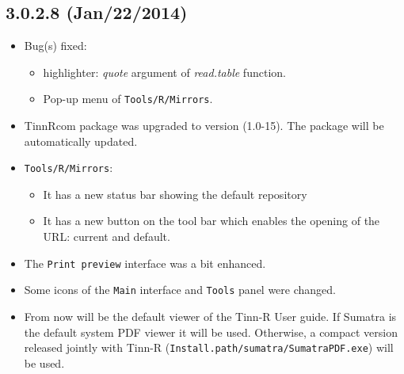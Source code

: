 \subsection*{3.0.2.8 (Jan/22/2014)}
\begin{itemize}
  \item Bug(s) fixed:
    \begin{itemize}
      \item \RR{} highlighter: \textit{quote} argument of \textit{read.table} function.
      \item Pop-up menu of \texttt{Tools/R/Mirrors}.
    \end{itemize}
  \item TinnRcom package was upgraded to version (1.0-15).
   The package will be automatically updated.
  \item \texttt{Tools/R/Mirrors}:
    \begin{itemize}
       \item It has a new status bar showing the default repository
       \item It has a new button on the tool bar which enables the opening of the
             URL: current and default.
    \end{itemize}
  \item The \texttt{Print preview} interface was a bit enhanced.
  \item Some icons of the \texttt{Main} interface and \texttt{Tools} panel were changed.
  \item From now 
   will be the default viewer of the Tinn-R User guide.
   If Sumatra is the default system PDF viewer it will be used. Otherwise, a compact version
   released jointly with Tinn-R (\texttt{Install.path/sumatra/SumatraPDF.exe}) will be used.
\end{itemize}